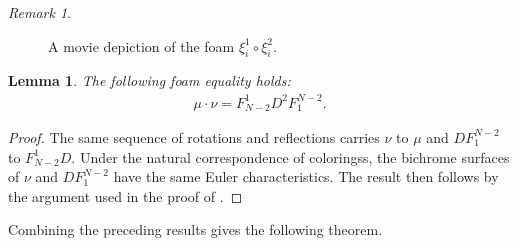\documentclass[12pt]{amsart}
\newtheorem{lemma}[theorem]{Lemma}
\theoremstyle{definition}
\theoremstyle{remark}
\newtheorem{remark}[theorem]{Remark}
\numberwithin{equation}{section}
\numberwithin{figure}{section}
\begin{document}
\begin{remark}
\begin{figure}[htbp]
{}
\caption{A movie depiction of the foam $\xi_i^1 \circ \xi_i^2$.}
\label{fig:xi}
\end{figure}
\end{remark}

\begin{lemma}\label{lem:munu = n-3 D D n-3}
    The following foam equality holds:
    \begin{align*}
         \mu \cdot \nu = F_{N-2}^1 D^2 F_{1}^{N-2}.
    \end{align*}
\end{lemma}
\begin{proof}
  The same sequence of rotations and reflections carries $\nu$ to $\mu$ and $D F_1^{N-2}$ to $F_{N-2}^1 D$. Under the natural correspondence of coloringss, the bichrome surfaces of $\nu$ and $D F_1^{N-2}$ have the same Euler characteristics. The result then follows by the argument used in the proof of \cite[Lemma 3.21]{RW2020}. 
\end{proof}

Combining the preceding results gives the following theorem.
\end{document}

